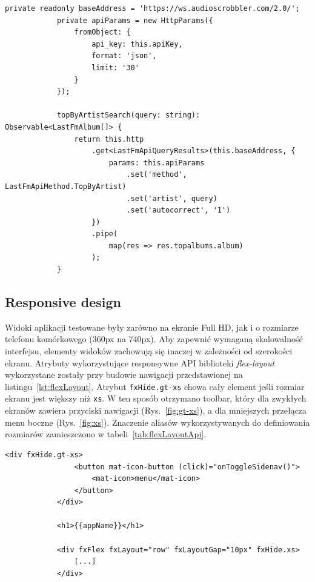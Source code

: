 		\begin{lstlisting}[label=lst:lastfmApi, caption=Metoda wykorzystujaca Api Last.fm, float]
			private readonly baseAddress = 'https://ws.audioscrobbler.com/2.0/';
			private apiParams = new HttpParams({
				fromObject: {
					api_key: this.apiKey,
					format: 'json',
					limit: '30'
				}
			});

			topByArtistSearch(query: string): Observable<LastFmAlbum[]> {
				return this.http
					.get<LastFmApiQueryResults>(this.baseAddress, {
						params: this.apiParams
							.set('method', LastFmApiMethod.TopByArtist)
							.set('artist', query)
							.set('autocorrect', '1')
					})
					.pipe(
						map(res => res.topalbums.album)
					);
			}
		\end{lstlisting}

	\subsection{Responsive design}
		Widoki aplikacji testowane były zarówno na ekranie Full HD, jak i o rozmiarze telefonu komórkowego (360px na 740px).
		Aby zapewnić wymaganą skalowalność interfejsu, elementy widoków zachowują się inaczej w zależności od szerokości ekranu.
		Atrybuty wykorzystujące responsywne API biblioteki \emph{flex-layout} wykorzystane zostały przy budowie nawigacji przedstawionej na listingu~\ref{lst:flexLayout}.
		Atrybut \verb|fxHide.gt-xs| chowa cały element jeśli rozmiar ekranu jest większy niż \verb|xs|.
		W ten sposób otrzymano toolbar, który dla zwykłych ekranów zawiera przyciski nawigacji (Rys.~\ref{fig:gt-xs}),
		a dla mniejszych przełącza menu boczne (Rys.~\ref{fig:xs}).
		Znaczenie aliasów wykorzystywanych do definiowania rozmiarów zamieszczono w tabeli~\ref{tab:flexLayoutApi}.

		\begin{lstlisting}[label=lst:flexLayout, caption=Menu nawigacji zależne od rozmiaru ekranu, float]
			<div fxHide.gt-xs>
				<button mat-icon-button (click)="onToggleSidenav()">
					<mat-icon>menu</mat-icon>
				</button>
			</div>

			<h1>{{appName}}</h1>
		
			<div fxFlex fxLayout="row" fxLayoutGap="10px" fxHide.xs>
				[...]
			</div>
		\end{lstlisting}

